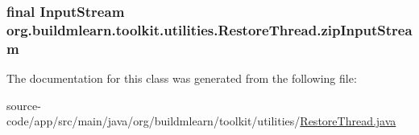 \subsubsection[{\texorpdfstring{zip\+Input\+Stream}{zipInputStream}}]{\setlength{\rightskip}{0pt plus 5cm}final Input\+Stream org.\+buildmlearn.\+toolkit.\+utilities.\+Restore\+Thread.\+zip\+Input\+Stream\hspace{0.3cm}{\ttfamily [private]}}\hypertarget{classorg_1_1buildmlearn_1_1toolkit_1_1utilities_1_1RestoreThread_a967b084e55b9959508a62aaa7e0169a7}{}\label{classorg_1_1buildmlearn_1_1toolkit_1_1utilities_1_1RestoreThread_a967b084e55b9959508a62aaa7e0169a7}


The documentation for this class was generated from the following file\+:\begin{DoxyCompactItemize}
\item 
source-\/code/app/src/main/java/org/buildmlearn/toolkit/utilities/\hyperlink{RestoreThread_8java}{Restore\+Thread.\+java}\end{DoxyCompactItemize}
